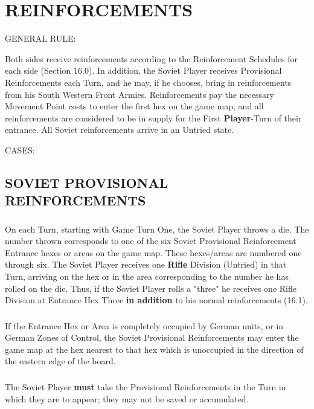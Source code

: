 \section{REINFORCEMENTS}

GENERAL RULE:

Both sides receive reinforcements according to the Reinforcement Schedules for each side (Section 16.0). In addition, the Soviet Player receives Provisional Reinforcements each Turn, and he may, if he chooses, bring in reinforcements from his South Western Front Armies. Reinforcements pay the necessary Movement Point costs to enter the first hex on the game map, and all reinforcements are considered to be in supply for the First \textbf{Player}-Turn of their entrance. All Soviet reinforcements arrive in an Untried state.


CASES:

\subsection{SOVIET PROVISIONAL REINFORCEMENTS}

\subsubsection{} On each Turn, starting with Game Turn One, the Soviet Player throws a die. The number thrown corresponds to one of the six Soviet Provisional Reinforcement Entrance hexes or areas on the game map. These hexes/areas are numbered one through six. The Soviet Player receives one \textbf{Rifle} Division (Untried) in that Turn, arriving on the hex or in the area corresponding to the number he has rolled on the die. Thus, if the Soviet Player rolls a "three" he receives one Rifle Division at Entrance Hex Three \textbf{in addition} to his normal reinforcements (16.1).

\subsubsection{} If the Entrance Hex or Area is completely occupied by German units, or in German Zones of Control, the Soviet Provisional Reinforcements may enter the game map at the hex nearest to that hex which is unoccupied in the direction of the eastern edge of the board.

\subsubsection{} The Soviet Player \textbf{must} take the Provisional Reinforcements in the Turn in which they are to appear; they may not be saved or accumulated.

